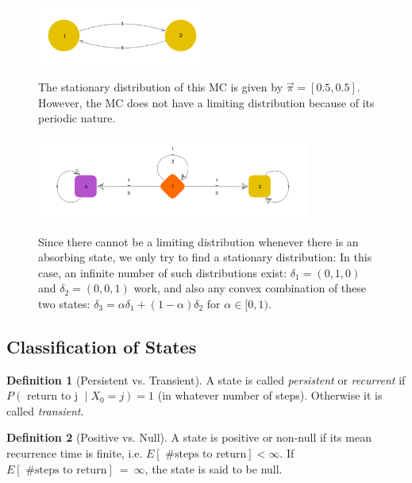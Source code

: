 \documentclass{article}
\theoremstyle{definition}
\newtheorem{defn}{Definition}[section]
\begin{document}
\begin{figure}[h!]
\centering
\includegraphics[width=0.5\textwidth]{images/exmc2}
\label{fig:exmc2}
\caption{ The stationary distribution of this MC is given by $\vec \pi = [0.5, 0.5]$. However, the MC does not have a limiting distribution because of its periodic nature.}
\end{figure}

\begin{figure}[h!]
\centering
\includegraphics[width=0.8\textwidth]{images/exmc3}
\label{fig:exmc3}
\caption{Since there cannot be a limiting distribution whenever there is an absorbing state, we only try to find a stationary distribution: In this case, an infinite number of such distributions exist: $\delta_1 = (0,1,0)$ and $\delta_2 = (0,0,1)$ work, and also any convex combination of these two states: $\delta_3 = \alpha \delta_1 + (1-\alpha) \delta_2$ for $\alpha \in [0,1)$.}
\end{figure}


\subsection{Classification of States}

\begin{defn}[Persistent vs. Transient]
A state is called \emph{persistent} or \emph{recurrent} if $P( \text{ return to j } \mid X_0 = j) = 1$ (in whatever number of steps). Otherwise it is called \emph{transient}.
\end{defn}

\begin{defn}[Positive vs. Null]
A state is positive or non-null if its mean recurrence time is finite, i.e.
$E\left[ \text{ \# steps to return} \right] < \infty$. If $E\left[ \text{ \# steps to return} \right]~=~\infty$, the state is said to be null.
\end{defn}
\end{document}
